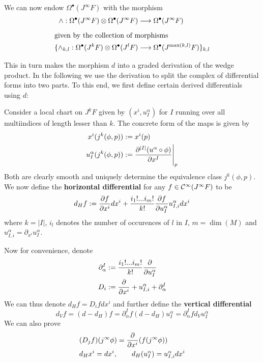 We can now endow $\Omega^\bullet(J^\infty F)$ with the morphism
\begin{align*}
  \wedge: \Omega^\bullet(J^\infty F) \mathbin{\mathop{\otimes}\displaylimits_{}} \Omega^\bullet(J^\infty F) &\longrightarrow \Omega^\bullet(J^\infty F)\\
  \intertext{given by the collection of morphisms}
  \{ \wedge_{k,l}: \Omega^\bullet(J^k F) \mathbin{\mathop{\otimes}\displaylimits_{}} \Omega^\bullet(J^l F) &\longrightarrow \Omega^\bullet(J^{\max(k,l)} F) \}_{k,l}
\end{align*}
This in turn makes the morphism $d$ into a graded derivation of the wedge product. In the following we use the derivation to split the complex of differential forms into two parts. To this end, we first define certain derived differentials using $d$:

\begin{definition}
  Consider a local chart on $J^kF$ given by $(x^i, u^\alpha_I)$ for $I$ running over all multiindices of length lesser than $k$. The concrete form of the maps is given by
  \begin{align*}
    x^i(j^k(\phi, p)) &:= x^i(p)\\
    u^\alpha_I (j^k(\phi, p)) &:= \dell{^{|I|} (u^\alpha \circ \phi)}{x^I} \Bigg|_p
  \end{align*}
  Both are clearly smooth and uniquely determine the equivalence class $j^k(\phi, p)$. We now define the \textbf{horizontal differential} for any $f\in\mathcal{C}^{\infty}(J^\infty F)$ to be
  $$ d_H f := \frac{\partial f}{\partial x^i} dx^i + \frac{i_1 ! ... i_m !}{k!} \frac{\partial f}{\partial u^\alpha_I} u^\alpha_{I,i} dx^i$$
  where $k = |I|$, $i_l$ denotes the number of occurences of $l$ in $I$, $m = \dim(M)$ and $u^\alpha_{I,i} = \partial_{x^i} u^\alpha_I$.
\end{definition}

Now for convenience, denote
\begin{align*}
  \partial^I_\alpha &:= \frac{i_1 ! ... i_m !}{k!} \frac{\partial }{\partial u^\alpha_I}\\
  D_i &:= \frac{\partial }{\partial x^i} + u^\alpha_{I,i} + \partial^I_\alpha
\end{align*}
We can thus denote $d_H f = D_i f dx^i$ and further define the \textbf{vertical differential}
$$ d_V f = (d-d_H) f = \partial^I_\alpha f (d-d_H) u^\alpha_I = \partial^I_\alpha f d_V u^\alpha_I$$
We can also prove
\begin{align*}
  &(D_j f ) (j^\infty \phi) = \dell{}{x^i}(f(j^\infty \phi))\\
  &d_H x^i = dx^i, \quad \quad d_H(u^\alpha_I) = u^\alpha_{I,i} dx^i
\end{align*}


